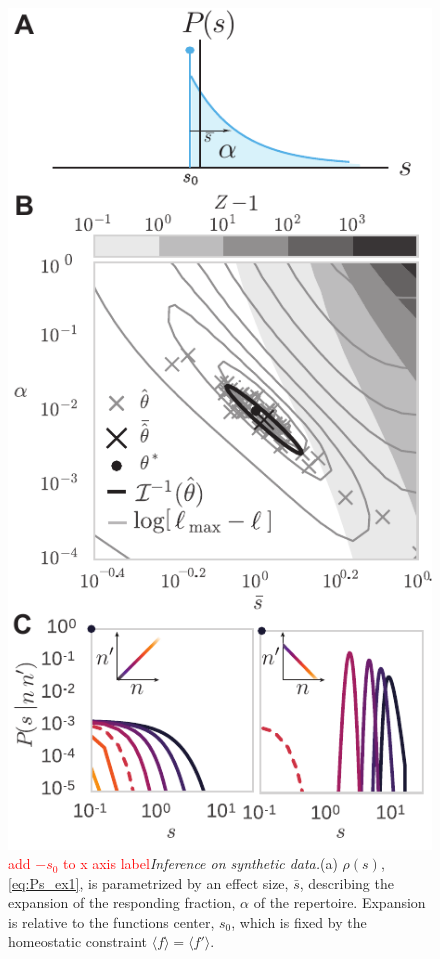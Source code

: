 \documentclass[letterpaper,english,prl,reprint,longbibliography]{revtex4-1} %
\newcommand{\re}[1]{\textcolor{red}{#1}}
\begin{document}
\begin{figure}[tbph!]
\includegraphics{fig5_diffexpr_eval}
\centering{}
\caption{
\re{add $-s_0$ to x axis label}\emph{Inference on synthetic data.}(a) $\rho(s)$,  \cref{eq:Ps_ex1}, is parametrized by an effect size, $\bar{s}$, describing the expansion of the responding fraction, $\alpha$ of the repertoire. 
Expansion is relative to the functions center, $s_0$, which is fixed by the homeostatic constraint $\langle f \rangle=\langle f' \rangle$.
}
\end{figure}
\end{document}
